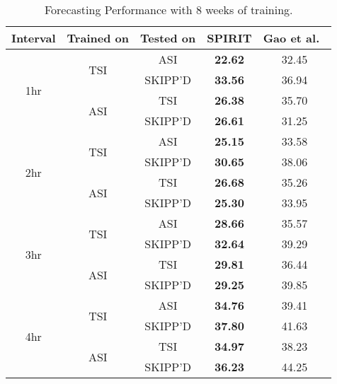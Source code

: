\begin{table}[h]
  \caption{
  Forecasting Performance with 8 weeks of training.
  }
  \label{tab:eightweek_forecast}
  \centering
  \setlength{\tabcolsep}{2pt}
  \renewcommand{\arraystretch}{1.2} 
  \begin{tabular}{c c c c c}
    \hline
    \textbf{Interval} & \textbf{Trained on} & \textbf{Tested on} & \textbf{SPIRIT} & \textbf{Gao et al.~\cite{wacv2022}} \\
    \hline
    \multirow{4}{*}{1hr} & \multirow{2}{*}{TSI} & ASI & \textbf{22.62} & 32.45 \\
                          & & SKIPP'D & \textbf{33.56} & 36.94 \\
                          \cline{2-5}
                          & \multirow{2}{*}{ASI} & TSI & \textbf{26.38} & 35.70 \\
                          & & SKIPP'D & \textbf{26.61} & 31.25 \\
    \hline
    \multirow{4}{*}{2hr} & \multirow{2}{*}{TSI} & ASI & \textbf{25.15} & 33.58 \\
                          & & SKIPP'D & \textbf{30.65} & 38.06 \\
                          \cline{2-5}
                          & \multirow{2}{*}{ASI} & TSI & \textbf{26.68} & 35.26 \\
                          & & SKIPP'D & \textbf{25.30} & 33.95 \\
    \hline
    \multirow{4}{*}{3hr} & \multirow{2}{*}{TSI} & ASI & \textbf{28.66} & 35.57 \\
                          & & SKIPP'D & \textbf{32.64} & 39.29 \\
                          \cline{2-5}
                          & \multirow{2}{*}{ASI} & TSI & \textbf{29.81} & 36.44 \\
                          & & SKIPP'D & \textbf{29.25} & 39.85 \\
    \hline
    \multirow{4}{*}{4hr} & \multirow{2}{*}{TSI} & ASI & \textbf{34.76} & 39.41 \\
                          & & SKIPP'D & \textbf{37.80} & 41.63 \\
                          \cline{2-5}
                          & \multirow{2}{*}{ASI} & TSI & \textbf{34.97} & 38.23 \\
                          & & SKIPP'D & \textbf{36.23} & 44.25 \\
    \hline
  \end{tabular}
\end{table}

